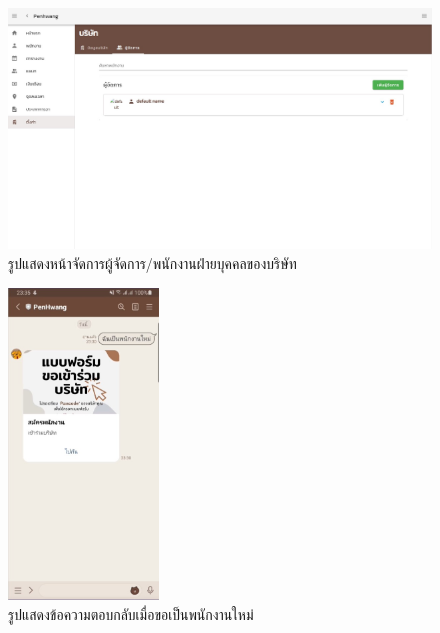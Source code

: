 \begin{figure}
  \begin{center}
    \includegraphics[width=14cm,keepaspectratio]{./images/manager.jpg}
  \end{center}
  \caption[รูปแสดงหน้าจัดการผู้จัดการ/พนักงานฝ่ายบุคคลของบริษัท]{รูปแสดงหน้าจัดการผู้จัดการ/พนักงานฝ่ายบุคคลของบริษัท} 
  \label{fig:manager}
\end{figure}

\begin{figure}
  \begin{center}
    \includegraphics[width=4cm,keepaspectratio]{./images/message_start_form.jpg}
  \end{center}
  \caption[รูปแสดงข้อความตอบกลับเมื่อขอเป็นพนักงานใหม่]{รูปแสดงข้อความตอบกลับเมื่อขอเป็นพนักงานใหม่} 
  \label{fig:message_start_form}
\end{figure}

